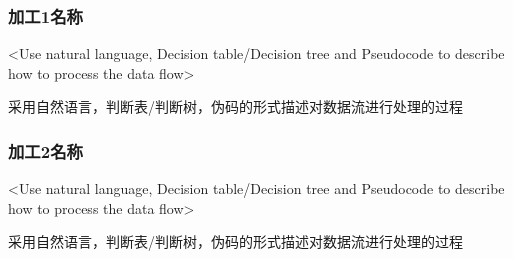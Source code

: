 \subsubsection{加工1名称}
<Use natural language, Decision table/Decision tree and Pseudocode to describe how to process the data flow>

采用自然语言，判断表/判断树，伪码的形式描述对数据流进行处理的过程

\subsubsection{加工2名称}
<Use natural language, Decision table/Decision tree and Pseudocode to describe how to process the data flow>

采用自然语言，判断表/判断树，伪码的形式描述对数据流进行处理的过程

